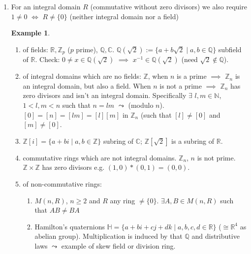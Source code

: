 \documentclass[11pt]{article}
\theoremstyle{definition}
\newtheorem{example}[thm]{Example}
\numberwithin{equation}{section}
\newcommand{\R}{\mathbb{R}}  %
\newcommand{\Q}{\mathbb{Q}}  %
\newcommand{\C}{\mathbb{C}}  %
\newcommand{\Z}{\mathbb{Z}}
\newcommand{\N}{\mathbb{N}} %
\begin{document}
\begin{enumerate}
    \begin{example}
    $\varphi: R \rightarrow R \times R$ which maps $a \rightarrow (a, 0)$ is NOT a ring homomorphism since $\varphi(1_R) = (1_R, 0) \neq 1_{R \times R}$ if $R \neq \{0\}$
    \end{example}
    \begin{example}
    $\psi: R \rightarrow R \times R$ which maps $a \rightarrow (a, a)$ is a ring homomorphism.
    \end{example}
    \item For an integral domain $R$ (commutative without zero divisors) we also require $1 \neq 0$ $\Leftrightarrow$ $R \neq \{0\}$ (neither integral domain nor a field)
    \begin{example}
    \begin{enumerate}
        \item of fields: $\R, \Z_p$ ($p$ prime), $\Q, \C$. $\Q(\sqrt{2}) := \{a + b\sqrt{2} \mid a, b \in \Q\}$ subfield of $\R$. Check: $0 \neq x \in \Q(\sqrt{2})$ $\implies$ $x^{-1} \in \Q(\sqrt{2})$ (need $\sqrt{2} \notin \Q$).
        \item of integral domains which are no fields: $\Z$, when $n$ is a prime $\implies$ $\Z_n$ is an integral domain, but also a field. When $n$ is not a prime $\implies$ $\Z_n$ has zero divisors and isn't an integral domain. Specifically $\exists$ $l, m \in \N$, $1 < l, m < n$ such that $n = lm$ $\leadsto$ (modulo $n$). $[0] = [n] = [lm] = [l][m]$ in $\Z_n$ (such that $[l] \neq [0]$ and $[m] \neq [0]$.
        \item $\Z[i] = \{a + bi \mid a, b \in \Z\}$ subring of $\C$; $\Z[\sqrt{2}]$ is a subring of $\R$.
        \item commutative rings which are not integral domains. $\Z_n$, $n$ is not prime. $\Z \times \Z$ has zero divisors e.g. $(1, 0)*(0, 1) = (0, 0)$.
        \item of non-commutative rings:
        \begin{enumerate}
            \item $M(n, R)$, $n \geq 2$ and $R$ any ring $\neq \{0\}$. $\exists A, B \in M(n, R)$ such that $AB \neq BA$
            \item Hamilton's quaternions
            $\mathds{H} = \{a+bi+cj+dk \mid a, b, c, d \in \R\}$ ($\cong \R^{4}$ as abelian group). Multiplication is induced by that $\Q$ and distributive laws $\leadsto$ example of skew field or division ring.
        \end{enumerate}
    \end{enumerate}
    \end{example}
\end{enumerate}
\end{document}
